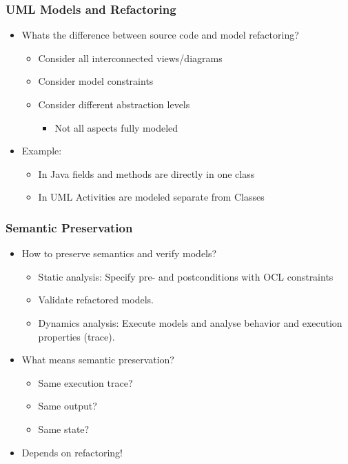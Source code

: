 \documentclass{beamer}
\begin{document}
\begin{frame}
\frametitle{UML Models and Refactoring}
\begin{itemize}
 \item Whats the difference between source code and model refactoring?
 \begin{itemize}
  \item Consider all interconnected views/diagrams
  \item Consider model constraints
  \item Consider different abstraction levels
    \begin{itemize}
	\item Not all aspects fully modeled
    \end{itemize}
 \end{itemize}
 \item Example:
\begin{itemize}
 \item In Java fields and methods are directly in one class
 \item In UML Activities are modeled separate from Classes
\end{itemize}
\end{itemize}        
\end{frame}


\begin{frame}
\frametitle{Semantic Preservation}
\begin{itemize}
 \item How to preserve semantics and verify models?
 \begin{itemize}
  \item Static analysis: Specify pre- and postconditions with OCL constraints
  \item Validate refactored models.
  \item Dynamics analysis: Execute models and analyse behavior and execution properties (trace).
 \end{itemize} 
\item What means semantic preservation?
 \begin{itemize}
  \item Same execution trace?
  \item Same output?
  \item Same state?
 \end{itemize}
 \item Depends on refactoring!
\end{itemize}
\end{frame}
\end{document}
